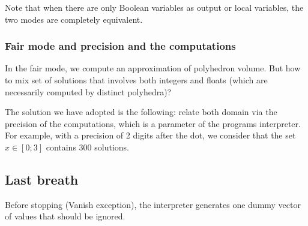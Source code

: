 Note that when there are only Boolean variables as output or local
variables, the two modes are completely equivalent.

\subsubsection{Fair mode and precision and the computations}

In the fair  mode, we compute an approximation  of polyhedron volume.
But  how to  mix set  of solutions  that involves  both  integers and
floats (which are necessarily computed by distinct polyhedra)?

The solution we have adopted is the following: relate both domain via
the precision of the computations, which is a parameter of the \lutin
programs interpreter. For example, with a precision of 2 digits after
the  dot, we  consider  that the  set  $x \in  [0;3]$ contains  $300$
solutions.



\subsection{Last breath}

 
 Before stopping (Vanish exception), the \lutin interpreter generates
 one dummy vector of values that should be ignored.

